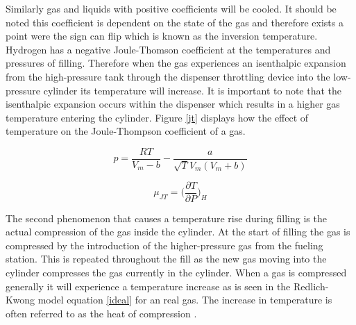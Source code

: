 \documentclass[paper=a4, fontsize=11pt, abstract=on]{scrartcl}
\numberwithin{equation}{section}		%
\numberwithin{figure}{section}			%
\numberwithin{table}{section}				%
\begin{document}
Similarly gas and liquids with positive coefficients will be cooled. It should be noted this coefficient is dependent on the state of the gas and therefore exists a point were the sign can flip which is known as the inversion temperature. Hydrogen has a negative Joule-Thomson coefficient at the temperatures and pressures of filling. Therefore when the gas experiences an isenthalpic expansion from the high-pressure tank through the dispenser throttling device into the low-pressure cylinder its temperature will increase. It is important to note that the isenthalpic expansion occurs within the dispenser which results in a higher gas temperature entering the cylinder. Figure \ref{jt} displays how the effect of temperature on the Joule-Thompson coefficient of a gas.

\begin{equation}
\label{ideal}
p=\frac{RT}{V_m-b}-\frac{a}{\sqrt{T}V_m(V_m+b)}
\end{equation}

\begin{equation}
\label{jte}
\mu_{JT} = \Bigg(\frac{\partial T}{\partial P}\Bigg)_H
\end{equation}

The second phenomenon that causes a temperature rise during filling is the actual compression of the gas inside the cylinder. At the start of filling the gas is compressed by the introduction of the higher-pressure gas from the fueling station. This is repeated throughout the fill as the new gas moving into the cylinder compresses the gas currently in the cylinder. When a gas is compressed generally it will experience a temperature increase as is seen in the Redlich-Kwong model equation \ref{ideal} for an real gas. The increase in temperature is often referred to as the heat of compression \cite{dick}. 
\end{document}
